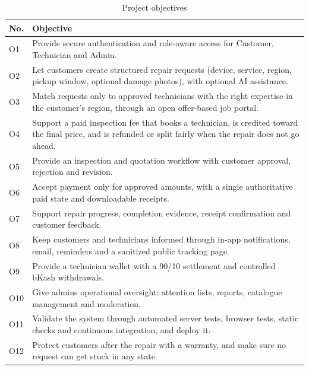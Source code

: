 \documentclass{standalone}
\begin{document}
\begin{table}[htbp]
\centering
\caption{Project objectives}
\label{tab:objectives}
\begin{tabularx}{\textwidth}{@{}lX@{}}
\toprule
\textbf{No.} & \textbf{Objective} \\
\midrule
O1 & Provide secure authentication and role-aware access for Customer, Technician and Admin. \\
O2 & Let customers create structured repair requests (device, service, region, pickup window, optional damage photos), with optional AI assistance. \\
O3 & Match requests only to approved technicians with the right expertise in the customer's region, through an open offer-based job portal. \\
O4 & Support a paid inspection fee that books a technician, is credited toward the final price, and is refunded or split fairly when the repair does not go ahead. \\
O5 & Provide an inspection and quotation workflow with customer approval, rejection and revision. \\
O6 & Accept payment only for approved amounts, with a single authoritative paid state and downloadable receipts. \\
O7 & Support repair progress, completion evidence, receipt confirmation and customer feedback. \\
O8 & Keep customers and technicians informed through in-app notifications, email, reminders and a sanitized public tracking page. \\
O9 & Provide a technician wallet with a 90/10 settlement and controlled bKash withdrawals. \\
O10 & Give admins operational oversight: attention lists, reports, catalogue management and moderation. \\
O11 & Validate the system through automated server tests, browser tests, static checks and continuous integration, and deploy it. \\
O12 & Protect customers after the repair with a warranty, and make sure no request can get stuck in any state. \\
\bottomrule
\end{tabularx}
\end{table}
\end{document}
